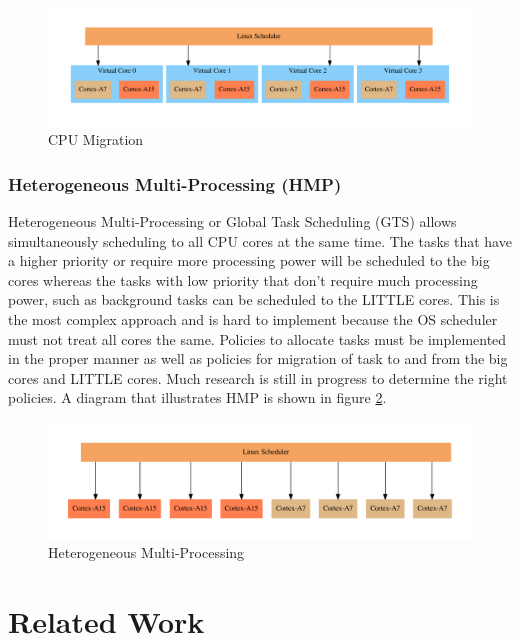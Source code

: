 \documentclass[11pt]{book}
\begin{document}
\begin{figure}[H]
    \centering
    \includegraphics[width=\textwidth]{figs/graphviz/in_kernel_switcher.pdf}
    \caption{CPU Migration}\label{cpu_migration}
\end{figure}

\subsection{Heterogeneous Multi-Processing (HMP)}

Heterogeneous Multi-Processing or Global Task Scheduling (GTS) allows simultaneously
scheduling to all CPU cores at the same time. The tasks that have a higher priority or
require more processing power will be scheduled to the big cores whereas the tasks with
low priority that don't require much processing power, such as background tasks can be
scheduled to the LITTLE cores. This is the most complex approach and is hard to implement
because the OS scheduler must not treat all cores the same. Policies to allocate tasks
must be implemented in the proper manner as well as policies for migration of task to and
from the big cores and LITTLE cores. Much research is still in progress to determine the
right policies. A diagram that illustrates HMP is shown in figure \ref{global_task_scheduling}.

\begin{figure}[H]
    \centering
    \includegraphics[width=\textwidth]{figs/graphviz/global_task_scheduling.pdf}
    \caption{Heterogeneous Multi-Processing}\label{global_task_scheduling}
\end{figure}



\chapter{Related Work}\label{related_work}
\end{document}
